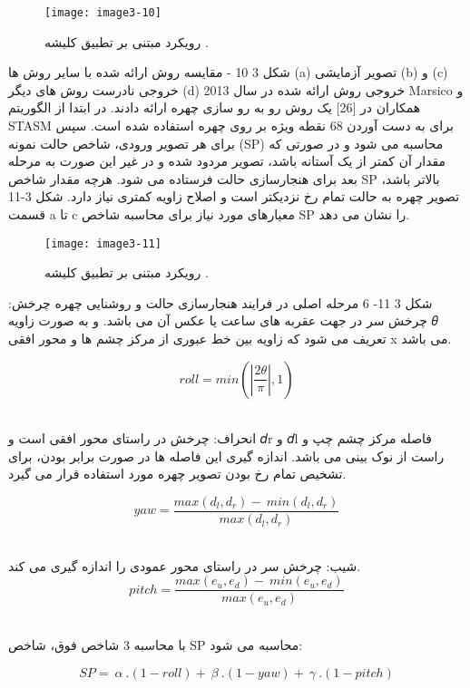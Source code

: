  \begin{figure}[h]
\centering
  \texttt{[image: image3-10]}
  \caption{رویکرد مبتنی بر تطبیق کلیشه  \cite{ref1}.}
  \label{image2-1}
\end{figure}
شکل ‏3 10 - مقایسه روش ارائه شده با سایر روش ها (a) تصویر آزمایشی (b) و (c) خروجی نادرست روش های دیگر (d) خروجی روش ارائه شده
در سال 2013 Marsico و همکاران در [26] یک روش رو به رو سازی چهره ارائه دادند. در ابتدا از الگوریتم STASM  برای به دست آوردن 68 نقطه ویژه بر روی چهره استفاده شده است. سپس برای هر تصویر ورودی، شاخص حالت نمونه  (SP) محاسبه می شود و در صورتی که مقدار آن کمتر از یک آستانه باشد، تصویر مردود شده و در غیر این صورت به مرحله بعد برای هنجارسازی حالت فرستاده می شود. هرچه مقدار شاخص SP بالاتر باشد، تصویر چهره به حالت تمام رخ نزدیکتر است و اصلاح زاویه کمتری نیاز دارد. شکل 3-11 قسمت a تا c معیارهای مورد نیاز برای محاسبه شاخص SP را نشان می دهد.
 \begin{figure}[h]
\centering
  \texttt{[image: image3-11]}
  \caption{رویکرد مبتنی بر تطبیق کلیشه  \cite{ref1}.}
  \label{image2-1}
\end{figure}
شکل ‏3 11- 6 مرحله اصلی در فرایند هنجارسازی حالت و روشنایی چهره
چرخش: چرخش سر در جهت عقربه های ساعت یا عکس آن می باشد. و به صورت زاویه 𝜃 تعریف می شود که زاویه بین خط عبوری از مرکز چشم ها و محور افقی x می باشد.

\begin{equation}\label{eq3-4}
roll=min(\left|\frac{2\theta}{\pi}\right|,1)
\end{equation}‏
	

انحراف: چرخش در راستای محور افقی است و 𝑑r و 𝑑l فاصله مرکز چشم چپ و راست از نوک بینی می باشد. اندازه گیری این فاصله ها در صورت برابر بودن، برای تشخیص تمام رخ بودن تصویر چهره مورد استفاده قرار می گیرد.

\begin{equation}\label{eq3-5}
yaw=\frac{max\left(d_l,d_r\right)-\ min(d_l,d_r)}{max(d_l,d_r)}
\end{equation}‏
	
شیب: چرخش سر در راستای محور عمودی را اندازه گیری می کند.
\begin{equation}\label{eq3-6}
pitch=\frac{max\left(e_u,e_d\right)-\ min(e_u,e_d)}{max(e_u,e_d)}	
\end{equation}‏


با محاسبه 3 شاخص فوق، شاخص SP محاسبه می شود:

\begin{equation}\label{eq3-7}
SP=\ \alpha\ .(1-roll)+\ \beta\ .(1-yaw)+\ \gamma\ .(1-pitch)	
\end{equation}‏


